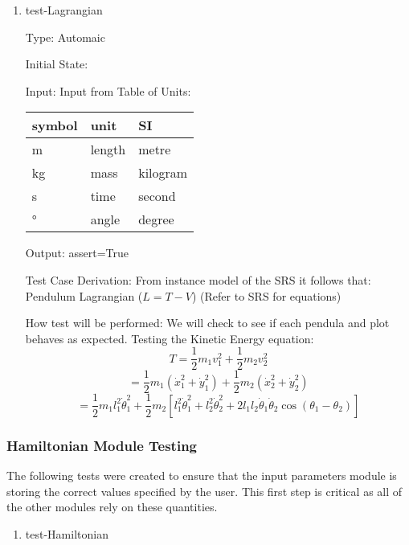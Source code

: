 \documentclass[12pt, titlepage]{article}
\begin{document}
{\begin{enumerate}				
	\item{test-Lagrangian\\}
	
	Type: Automaic 
	
	Initial State: 
	
	Input: Input from Table of Units:\\
  \noindent \begin{tabular}{l l l} 
    \toprule		
    \textbf{symbol} & \textbf{unit} & \textbf{SI}\\
    \midrule 
    \si{\metre} & length & metre\\
    \si{\kilogram} & mass & kilogram\\
    \si{\second} & time & second\\
    \si{\degree} & angle & degree\\
    \bottomrule
  \end{tabular}
	
	Output: assert=True
	
	Test Case Derivation: From instance model of the SRS it follows that:
	Pendulum Lagrangian ($L=T-V$)
	(Refer to SRS for equations)
	
	How test will be performed: We will check to see if each pendula and 
	plot behaves as expected.
	Testing the Kinetic Energy equation:
	$$ T = \displaystyle\frac{1}{2}m_1v_1^2 + \frac{1}{2}m_2v_2^2 $$
$$ = \frac{1}{2}m_1(\dot{x}_1^2 + \dot{y}_1^2) + \frac{1}{2}m_2(\dot{x}_2^2 +
\dot{y}_2^2) $$
$$ = \frac{1}{2}m_1 l_1^2 \dot{\theta}_1^2 + \frac{1}{2}m_2\left[l_1^2
\dot{\theta}_1^2 + l_2^2 \dot{\theta}_2^2 + 2l_1l_2\dot{\theta}_1\dot{\theta}_2
\cos(\theta_1 - \theta_2)\right]$$
			
\end{enumerate} 

\subsubsection{\progname Hamiltonian Module Testing}

The following tests were created to ensure that the input parameters module is 
storing the correct values specified by the user. This first step is critical 
as all of the other modules rely on these quantities.

\begin{enumerate}				
	\item{test-Hamiltonian\\}
	

\end{enumerate}}
\end{document}
